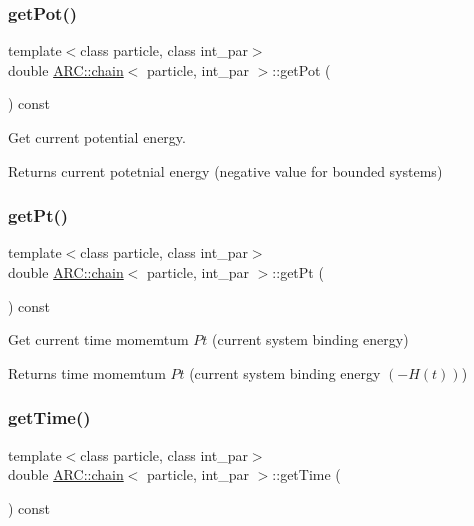 \subsubsection{\texorpdfstring{get\+Pot()}{getPot()}}
{\footnotesize\ttfamily template$<$class particle, class int\+\_\+par$>$ \\
double \hyperlink{classARC_1_1chain}{A\+R\+C\+::chain}$<$ particle, int\+\_\+par $>$\+::get\+Pot (\begin{DoxyParamCaption}{ }\end{DoxyParamCaption}) const\hspace{0.3cm}{\ttfamily [inline]}}



Get current potential energy. 

\begin{DoxyReturn}{Returns}
current potetnial energy (negative value for bounded systems) 
\end{DoxyReturn}
\hypertarget{classARC_1_1chain_a1404204bd5665aa2d12d57cf653b779c}{}\label{classARC_1_1chain_a1404204bd5665aa2d12d57cf653b779c} 
\subsubsection{\texorpdfstring{get\+Pt()}{getPt()}}
{\footnotesize\ttfamily template$<$class particle, class int\+\_\+par$>$ \\
double \hyperlink{classARC_1_1chain}{A\+R\+C\+::chain}$<$ particle, int\+\_\+par $>$\+::get\+Pt (\begin{DoxyParamCaption}{ }\end{DoxyParamCaption}) const\hspace{0.3cm}{\ttfamily [inline]}}



Get current time momemtum $Pt$ (current system binding energy) 

\begin{DoxyReturn}{Returns}
time momemtum $Pt$ (current system binding energy $(-H(t))$) 
\end{DoxyReturn}
\hypertarget{classARC_1_1chain_ad21bc515c01cf62e65d6d749d8babd63}{}\label{classARC_1_1chain_ad21bc515c01cf62e65d6d749d8babd63} 
\subsubsection{\texorpdfstring{get\+Time()}{getTime()}}
{\footnotesize\ttfamily template$<$class particle, class int\+\_\+par$>$ \\
double \hyperlink{classARC_1_1chain}{A\+R\+C\+::chain}$<$ particle, int\+\_\+par $>$\+::get\+Time (\begin{DoxyParamCaption}{ }\end{DoxyParamCaption}) const\hspace{0.3cm}{\ttfamily [inline]}}



